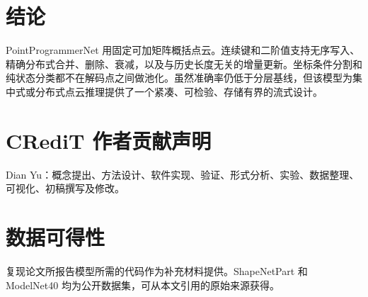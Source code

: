 \documentclass[UTF8,a4paper,11pt,fontset=windows]{ctexart}
\begin{document}
\section{结论}

PointProgrammerNet 用固定可加矩阵概括点云。连续键和二阶值支持无序写入、精确分布式合并、删除、衰减，以及与历史长度无关的增量更新。坐标条件分割和纯状态分类都不在解码点之间做池化。虽然准确率仍低于分层基线，但该模型为集中式或分布式点云推理提供了一个紧凑、可检验、存储有界的流式设计。

\section*{CRediT 作者贡献声明}

Dian Yu：概念提出、方法设计、软件实现、验证、形式分析、实验、数据整理、可视化、初稿撰写及修改。

\section*{数据可得性}

复现论文所报告模型所需的代码作为补充材料提供。ShapeNetPart 和 ModelNet40 均为公开数据集，可从本文引用的原始来源获得。



\end{document}
